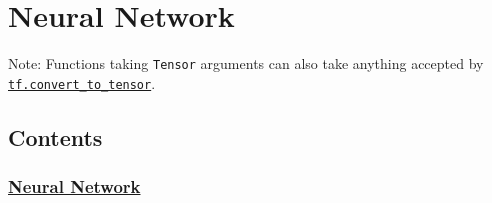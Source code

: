 



\section{Neural Network }\label{neural-network}

Note: Functions taking \texttt{Tensor} arguments can also take anything
accepted by
\href{../../api_docs/python/framework.md\#convert_to_tensor}{\texttt{tf.convert\_to\_tensor}}.

\subsection{Contents}\label{contents}

\subsubsection{\texorpdfstring{\protect\hyperlink{AUTOGENERATED-neural-network}{Neural
Network}}{Neural Network}}\label{neural-network-1}

